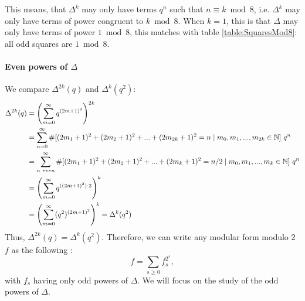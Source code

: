 This means, that $\Delta^k$ may only have terms $q^n$ such that $n \equiv k \bmod 8$, i.e. $\Delta^k$ may only have terms of power congruent to $k \bmod 8$.
When $k=1$, this is that $\Delta$ may only have terms of power $1 \bmod 8$, this matches with table \ref{table:SquaresMod8}: all odd squares are $1 \bmod 8$.
\label{ObservationsMod8}

\paragraph{Even powers of $\Delta$}
We compare $\Delta^{2k}(q)$ and $\Delta^k(q^2)$:
\begin{align*}
	\Delta^{2k}(q) 
	&= \left( \sum_{m=0}^{\infty} q^{(2m+1)^2} \right)^{2k} \\
	&= \sum_{n=0}^{\infty} \#[ (2m_1+1)^2+(2m_2+1)^2+...+(2m_{2k}+1)^2=n \mid m_0,m_1,...,m_{2k} \in \mathbb{N} ] \  q^n\\
	&= \sum_{n \ even}^{\infty} \#[ (2m_1+1)^2+(2m_2+1)^2+...+(2m_k+1)^2=n/2 \mid m_0,m_1,...,m_k \in \mathbb{N} ] \  q^n\\
	&= \left( \sum_{m=0}^{\infty} q^{((2m+1)^2) \cdot 2} \right)^k \\
	&= \left( \sum_{m=0}^{\infty} (q^2)^{(2m+1)^2} \right)^k = \Delta^{k}(q^2)
\end{align*}
Thus, $\Delta^{2k}(q) = \Delta^k(q^2)$.
Therefore, we can write any modular form modulo 2 $f$ as the following \cite[(3)]{OrdreNilpotenceOperateurHecke}:
$$
f = \sum_{s \geq 0} f_s^{2^s},
$$
with $f_s$ having only odd powers of $\Delta$.
We will focus on the study of the odd powers of $\Delta$.

